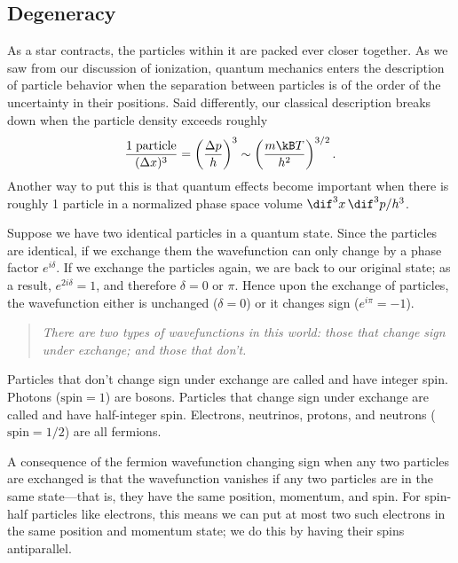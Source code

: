 \subsection{Degeneracy}
\label{s.degeneracy}

As a star contracts, the particles within it are packed ever closer together.  As we saw from our discussion of ionization, quantum mechanics enters the description of particle behavior when the separation between particles is of the order of the uncertainty in their positions.  Said differently, our classical description breaks down when the particle density exceeds roughly
\begin{equation}\label{e.heuristic-quantum-density}
    \frac{1\;\textrm{particle}}{(\Delta x)^3} 
    = \left(\frac{\Delta p}{h}\right)^3 
    \sim \left(\frac{m\kB T}{h^2}\right)^{3/2}.
\end{equation}
Another way to put this is that quantum effects become important when there is roughly 1 particle in a normalized phase space volume $\dif^{3}x\,\dif^{3}p/h^{3}$.

Suppose we have two identical particles in a quantum state. Since the particles are identical, if we exchange them the wavefunction can only change by a phase factor $e^{i\delta}$. If we exchange the particles again, we are back to our original state; as a result, $e^{2i\delta} = 1$, and therefore $\delta = 0$ or $\pi$. Hence upon the exchange of particles, the wavefunction either is unchanged ($\delta=0$) or it changes sign ($e^{i\pi}=-1$).
\begin{quote}\itshape
    There are two types of wavefunctions in this world: those that change sign under exchange; and those that don't.
\end{quote}
Particles that don't change sign under exchange are called  and have integer spin. Photons ($\textrm{spin} = 1$) are bosons. Particles that change sign under exchange are called  and have half-integer spin. Electrons, neutrinos, protons, and neutrons ($\textrm{spin} = 1/2$) are all fermions. 

A consequence of the fermion wavefunction changing sign when any two particles are exchanged is that the wavefunction vanishes if any two particles are in the same state---that is, they have the same position, momentum, and spin. For spin-half particles like electrons, this means we can put at most two such electrons in the same position and momentum state; we do this by having their spins antiparallel.


